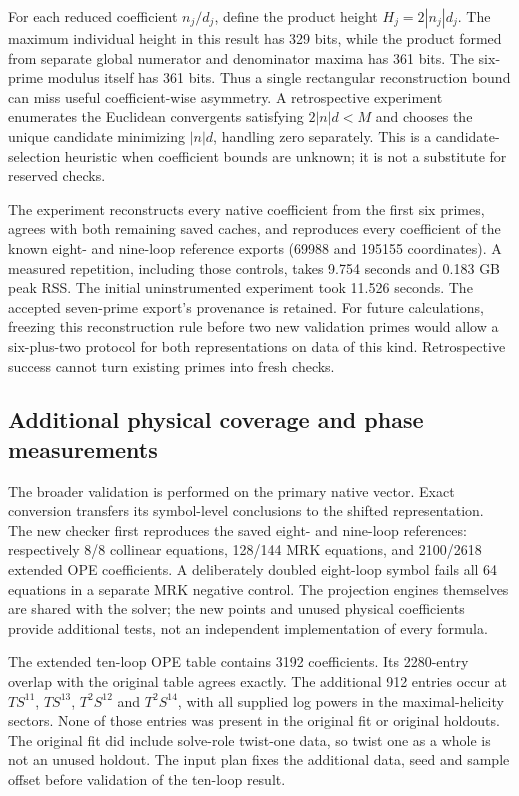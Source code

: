 \documentclass[11pt]{article}
\begin{document}
For each reduced coefficient $n_j/d_j$, define the product height
$H_j=2|n_j|d_j$. The maximum individual height in this result has 329 bits,
while the product formed from separate global numerator and denominator
maxima has 361 bits. The six-prime modulus itself has 361 bits. Thus a
single rectangular reconstruction bound can miss useful coefficient-wise
asymmetry. A retrospective experiment enumerates the Euclidean convergents
satisfying $2|n|d<M$ and chooses the unique candidate minimizing $|n|d$,
handling zero separately. This is a candidate-selection heuristic when
coefficient bounds are unknown; it is not a substitute for reserved checks.

The experiment reconstructs every native coefficient from the first six
primes, agrees with both remaining saved caches, and reproduces every
coefficient of the known eight- and nine-loop reference exports (69988 and
195155 coordinates). A measured repetition, including those controls,
takes 9.754 seconds and 0.183 GB peak RSS. The initial uninstrumented
experiment took 11.526 seconds. The accepted seven-prime export's provenance
is retained. For future calculations, freezing this reconstruction rule
before two new validation primes would allow a six-plus-two protocol for
both representations on data of this kind. Retrospective success cannot
turn existing primes into fresh checks.

\subsection{Additional physical coverage and phase measurements}
The broader validation is performed on the primary native vector. Exact
conversion transfers its symbol-level conclusions to the shifted
representation. The new checker first reproduces the saved eight- and
nine-loop references: respectively 8/8 collinear equations, 128/144 MRK
equations, and 2100/2618 extended OPE coefficients. A deliberately doubled
eight-loop symbol fails all 64 equations in a separate MRK negative control.
The projection engines themselves are shared with the solver; the new
points and unused physical coefficients provide additional tests, not an
independent implementation of every formula.

The extended ten-loop OPE table contains 3192 coefficients. Its 2280-entry
overlap with the original table agrees exactly. The additional 912 entries
occur at $T S^{11}$, $T S^{13}$, $T^2 S^{12}$ and $T^2 S^{14}$, with all
supplied log powers in the maximal-helicity sectors. None of those entries
was present in the original fit or original holdouts. The original fit did
include solve-role twist-one data, so twist one as a whole is not an unused
holdout. The input plan fixes the additional data, seed and sample offset
before validation of the ten-loop result.
\end{document}
